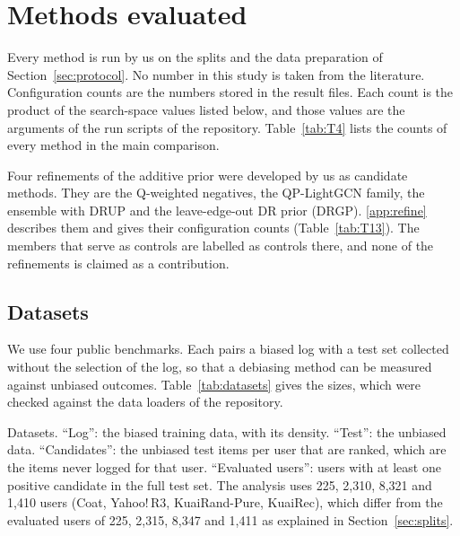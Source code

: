 \section{Methods evaluated}\label{sec:methods}

Every method is run by us on the splits and the data preparation of Section~\ref{sec:protocol}. No number in
this study is taken from the literature. Configuration counts are the numbers stored in the result files.
Each count is the product of the search-space values listed below, and those values are the arguments of the run
scripts of the repository. Table~\ref{tab:T4} lists the counts of every method in the main comparison.

Four refinements of the additive prior were developed by us as candidate methods. They are the Q-weighted
negatives, the QP-LightGCN family, the ensemble with DRUP and the leave-edge-out DR prior (DRGP). \ref{app:refine}
describes them and gives their configuration counts (Table~\ref{tab:T13}). The members that serve as controls are
labelled as controls there, and none of the refinements is claimed as a contribution.

\subsection{Datasets}\label{sec:datasets}

We use four public benchmarks. Each pairs a biased log with a test set collected without the selection of the
log, so that a debiasing method can be measured against unbiased outcomes. Table~\ref{tab:datasets} gives the
sizes, which were checked against the data loaders of the repository.

\begin{table}[htbp]\centering\footnotesize
\caption{Datasets. ``Log'': the biased training data, with its density. ``Test'': the unbiased data.
``Candidates'': the unbiased test items per user that are ranked, which are the items never logged for that
user. ``Evaluated users'': users with at least one positive candidate in the full test set. The analysis uses
225, 2{,}310, 8{,}321 and 1{,}410 users (Coat, Yahoo!\,R3, KuaiRand-Pure, KuaiRec), which differ from the evaluated
users of 225, 2{,}315, 8{,}347 and 1{,}411 as explained in Section~\ref{sec:splits}.}\label{tab:datasets}
\begin{adjustbox}{max width=\textwidth}

\end{adjustbox}
\end{table}

